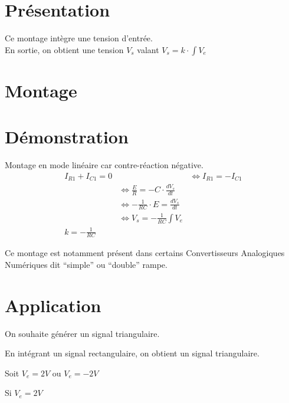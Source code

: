 \section{Présentation}
Ce montage intègre une tension d’entrée. \\
En sortie, on obtient une tension $V_s$ valant $V_s=k \cdot \int V_e$

\section{Montage}


\section{Démonstration}

Montage en mode linéaire car contre-réaction négative. \\


\begin{align}
I_{R1} + I_{C1}  = 0 & 
& \Leftrightarrow I_{R1} = -I_{C1} \\
& \Leftrightarrow \frac{E}{R} = - C \cdot \frac{dV_s}{dt} \\
& \Leftrightarrow -\frac{1}{RC}\cdot E = \frac{dV_s}{dt} \\
& \Leftrightarrow V_s = -\frac{1}{RC} \int V_e \\
k=-\frac{1}{RC} &
\end{align}
   
Ce montage est notamment présent dans certains Convertisseurs Analogiques Numériques dit “simple” ou “double” rampe. 


\section{Application}

\begin{exemple}
On souhaite générer un signal triangulaire.
\end{exemple}


En intégrant un signal rectangulaire, on obtient un signal triangulaire.



Soit $V_e=2V$ ou $V_e=-2V$

Si $V_e=2V$ \\

